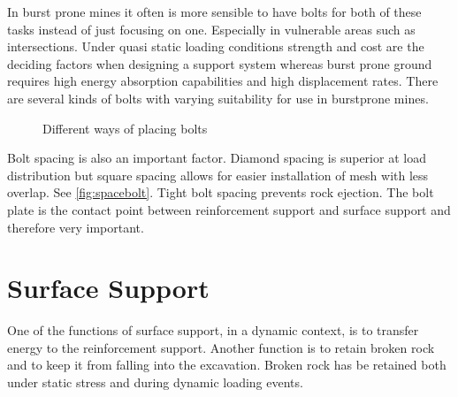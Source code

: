 In burst prone mines it often is more sensible to %
have bolts for both of these tasks instead of just focusing on one. Especially in vulnerable areas such as intersections. Under quasi static loading conditions strength and cost are the deciding factors when designing a support system whereas burst prone ground requires high energy absorption capabilities and high displacement rates. %
There are several kinds of bolts with varying suitability for use in burstprone mines. %

\begin{figure}
    \centering


    \caption{Different ways of placing bolts}
    \label{fig:spacebolt}
\end{figure}

Bolt spacing is also an important factor. Diamond spacing is superior at load distribution but square spacing allows for easier installation of mesh with less overlap. \autocite[4.14]{canada96} See \autoref{fig:spacebolt}.
Tight bolt spacing prevents rock ejection. \autocite[217]{Heal10}
The bolt plate is the contact point between reinforcement support and surface support and therefore very important.

\section{Surface Support}
One of the functions of surface support, in a dynamic context, is to transfer energy to the reinforcement support. \autocite[210]{Heal10} %
Another function is to retain broken rock and to keep it from falling into the excavation. \autocite[2.16]{canada96} Broken rock has be retained both under static stress and during dynamic loading events.

